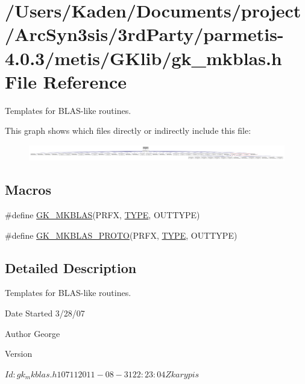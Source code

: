 \hypertarget{a00056}{}\section{/\+Users/\+Kaden/\+Documents/project/\+Arc\+Syn3sis/3rd\+Party/parmetis-\/4.0.3/metis/\+G\+Klib/gk\+\_\+mkblas.h File Reference}
\label{a00056}


Templates for B\+L\+A\+S-\/like routines.  


This graph shows which files directly or indirectly include this file\+:\nopagebreak
\begin{figure}[H]
\begin{center}
\leavevmode
\includegraphics[width=350pt]{a00058}
\end{center}
\end{figure}
\subsection*{Macros}
\begin{DoxyCompactItemize}
\item 
\#define \hyperlink{a00056_a8b690e00b2c27f72af59791a93ce5b22}{G\+K\+\_\+\+M\+K\+B\+L\+AS}(P\+R\+FX,  \hyperlink{a00608_a0bc6723d5d4776ab7cdc646728b775f7}{T\+Y\+PE},  O\+U\+T\+T\+Y\+PE)
\item 
\#define \hyperlink{a00056_ac5883961aa3d134a194edcfc6ceb7388}{G\+K\+\_\+\+M\+K\+B\+L\+A\+S\+\_\+\+P\+R\+O\+TO}(P\+R\+FX,  \hyperlink{a00608_a0bc6723d5d4776ab7cdc646728b775f7}{T\+Y\+PE},  O\+U\+T\+T\+Y\+PE)
\end{DoxyCompactItemize}


\subsection{Detailed Description}
Templates for B\+L\+A\+S-\/like routines. 

\begin{DoxyDate}{Date}
Started 3/28/07 
\end{DoxyDate}
\begin{DoxyAuthor}{Author}
George 
\end{DoxyAuthor}
\begin{DoxyVersion}{Version}
\begin{DoxyVerb}$Id: gk_mkblas.h 10711 2011-08-31 22:23:04Z karypis $ \end{DoxyVerb}
 
\end{DoxyVersion}


